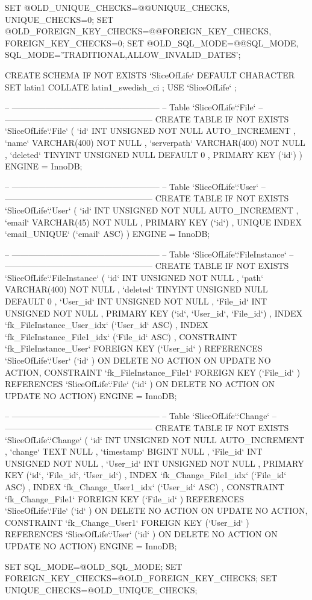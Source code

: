 SET @OLD_UNIQUE_CHECKS=@@UNIQUE_CHECKS, UNIQUE_CHECKS=0;
SET @OLD_FOREIGN_KEY_CHECKS=@@FOREIGN_KEY_CHECKS, FOREIGN_KEY_CHECKS=0;
SET @OLD_SQL_MODE=@@SQL_MODE, SQL_MODE='TRADITIONAL,ALLOW_INVALID_DATES';

CREATE SCHEMA IF NOT EXISTS `SliceOfLife` DEFAULT CHARACTER SET latin1 COLLATE latin1_swedish_ci ;
USE `SliceOfLife` ;

-- -----------------------------------------------------
-- Table `SliceOfLife`.`File`
-- -----------------------------------------------------
CREATE  TABLE IF NOT EXISTS `SliceOfLife`.`File` (
  `id` INT UNSIGNED NOT NULL AUTO_INCREMENT ,
  `name` VARCHAR(400) NOT NULL ,
  `serverpath` VARCHAR(400) NOT NULL ,
  `deleted` TINYINT UNSIGNED NULL DEFAULT 0 ,
  PRIMARY KEY (`id`) )
ENGINE = InnoDB;


-- -----------------------------------------------------
-- Table `SliceOfLife`.`User`
-- -----------------------------------------------------
CREATE  TABLE IF NOT EXISTS `SliceOfLife`.`User` (
  `id` INT UNSIGNED NOT NULL AUTO_INCREMENT ,
  `email` VARCHAR(45) NOT NULL ,
  PRIMARY KEY (`id`) ,
  UNIQUE INDEX `email_UNIQUE` (`email` ASC) )
ENGINE = InnoDB;


-- -----------------------------------------------------
-- Table `SliceOfLife`.`FileInstance`
-- -----------------------------------------------------
CREATE  TABLE IF NOT EXISTS `SliceOfLife`.`FileInstance` (
  `id` INT UNSIGNED NOT NULL ,
  `path` VARCHAR(400) NOT NULL ,
  `deleted` TINYINT UNSIGNED NULL DEFAULT 0 ,
  `User_id` INT UNSIGNED NOT NULL ,
  `File_id` INT UNSIGNED NOT NULL ,
  PRIMARY KEY (`id`, `User_id`, `File_id`) ,
  INDEX `fk_FileInstance_User_idx` (`User_id` ASC) ,
  INDEX `fk_FileInstance_File1_idx` (`File_id` ASC) ,
  CONSTRAINT `fk_FileInstance_User`
    FOREIGN KEY (`User_id` )
    REFERENCES `SliceOfLife`.`User` (`id` )
    ON DELETE NO ACTION
    ON UPDATE NO ACTION,
  CONSTRAINT `fk_FileInstance_File1`
    FOREIGN KEY (`File_id` )
    REFERENCES `SliceOfLife`.`File` (`id` )
    ON DELETE NO ACTION
    ON UPDATE NO ACTION)
ENGINE = InnoDB;


-- -----------------------------------------------------
-- Table `SliceOfLife`.`Change`
-- -----------------------------------------------------
CREATE  TABLE IF NOT EXISTS `SliceOfLife`.`Change` (
  `id` INT UNSIGNED NOT NULL AUTO_INCREMENT ,
  `change` TEXT NULL ,
  `timestamp` BIGINT NULL ,
  `File_id` INT UNSIGNED NOT NULL ,
  `User_id` INT UNSIGNED NOT NULL ,
  PRIMARY KEY (`id`, `File_id`, `User_id`) ,
  INDEX `fk_Change_File1_idx` (`File_id` ASC) ,
  INDEX `fk_Change_User1_idx` (`User_id` ASC) ,
  CONSTRAINT `fk_Change_File1`
    FOREIGN KEY (`File_id` )
    REFERENCES `SliceOfLife`.`File` (`id` )
    ON DELETE NO ACTION
    ON UPDATE NO ACTION,
  CONSTRAINT `fk_Change_User1`
    FOREIGN KEY (`User_id` )
    REFERENCES `SliceOfLife`.`User` (`id` )
    ON DELETE NO ACTION
    ON UPDATE NO ACTION)
ENGINE = InnoDB;



SET SQL_MODE=@OLD_SQL_MODE;
SET FOREIGN_KEY_CHECKS=@OLD_FOREIGN_KEY_CHECKS;
SET UNIQUE_CHECKS=@OLD_UNIQUE_CHECKS;
